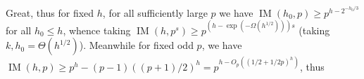 \documentclass[11pt]{article}
\theoremstyle{plain}
\theoremstyle{remark}
\newcommand{\IM}{\operatorname{IM}}
\begin{document}
Great, thus for fixed $h$, for all sufficiently large $p$ we have $\IM(h_0,p)\ge p^{h-2^{-h_0/3}}$ for all $h_0\le h$, whence taking $\IM(h,p^s)\ge p^{(h-\exp(-\Omega(h^{1/2})))s}$ (taking $k,h_0=\Theta(h^{1/2})$). Meanwhile for fixed odd $p$, we have $\IM(h,p)\ge p^h- (p-1)((p+1)/2)^h = p^{h- O_p((1/2+1/2p)^{h})}$, thus
\end{document}
